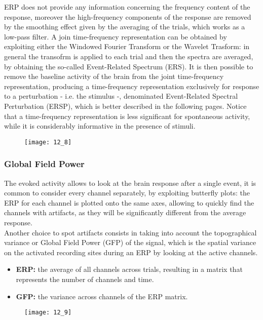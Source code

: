 ERP does not provide any information concerning the frequency content of the response,
moreover the high-frequency components of the response are removed by the smoothing effect
given by the averaging of the trials, which works as a low-pass filter. A join time-frequency
representation can be obtained by exploiting either the Windowed Fourier Transform or the
Wavelet Trasform: in general the transofrm is applied to each trial and then the spectra
are averaged, by obtaining the so-called Event-Related Spectrum (ERS). It is then possible
to remove the baseline activity of the brain from the joint time-frequency representation,
producing a time-frequency representation exclusively for response to a perturbation
- i.e. the stimulus -, denominated Event-Related Spectral Perturbation (ERSP), which is
better described in the following pages.
Notice that a time-frequency representation is less significant for spontaneous activity,
while it is considerably informative in the presence of stimuli.
\begin{figure}[H]
    \centering
    \texttt{[image: 12\_8]}
\end{figure}
\subsubsection{Global Field Power}
The evoked activity allows to look at the brain response after a single event, it is
common to consider every channel separately, by exploiting butterfly plots: the ERP for
each channel is plotted onto the same axes, allowing to quickly find the channels with
artifacts, as they will be significantly different from the average response.\\
Another choice to spot artifacts consists in taking into account the topographical variance
or Global Field Power (GFP) of the signal, which is the spatial variance on the activated
recording sites during an ERP by looking at the active channels.
\begin{itemize}
    \item \textbf{ERP:} the average of all channels across trials, resulting in a matrix that
    represents the number of channels and time.
    \item \textbf{GFP:} the variance across channels of the ERP matrix.
\end{itemize}
\begin{figure}[H]
    \centering
    \texttt{[image: 12\_9]}
\end{figure}
